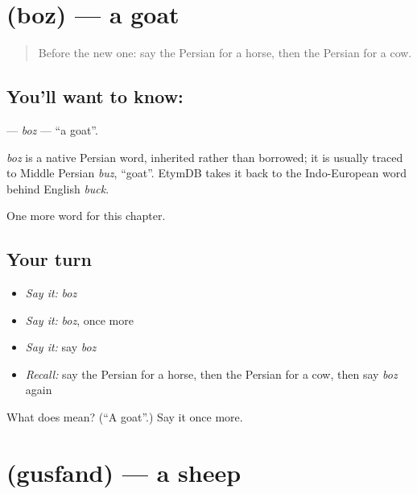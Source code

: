 \section[\texorpdfstring{\fa{بز} (boz)}{بز (boz)}]{ (boz) — a goat}

\label{lesson:FA-C55-boz}



\begin{quote}
Before the new one: say the Persian for a horse, then the Persian for a cow.
\end{quote}

\subsection*{You'll want to know: }
\textbf{} — \emph{boz} — \textquotedblleft{}a goat\textquotedblright{}.

\begin{cousinweb}
\emph{boz} is a native Persian word, inherited rather than borrowed; it is usually traced to Middle Persian \emph{buz}, \textquotedblleft{}goat\textquotedblright{}. EtymDB takes it back to the Indo-European word behind English \emph{buck}.
\end{cousinweb}

\begin{grammarlens}[title={What you've built}]
One more word for this chapter.
\end{grammarlens}

\subsection*{Your turn}
\begin{itemize}
\raggedright
  \item \emph{Say it:} \emph{boz}
  \item \emph{Say it:} \emph{boz}, once more
  \item \emph{Say it:} say \emph{boz}
  \item \emph{Recall:} say the Persian for a horse, then the Persian for a cow, then say \emph{boz} again
\end{itemize}

\begin{tcolorbox}[breakable,colback=teal!4,colframe=teal!35!black,title={Before you move on}]
What does  mean? (\textquotedblleft{}A goat\textquotedblright{}.) Say it once more.
\end{tcolorbox}
\section[\texorpdfstring{\fa{گوسفند} (gusfand)}{گوسفند (gusfand)}]{ (gusfand) — a sheep}


